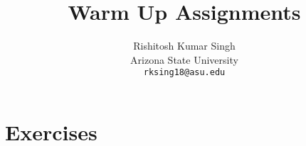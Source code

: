 \documentclass[10pt,twocolumn,letterpaper]{article}
\title{Warm Up Assignments}
\author{Rishitosh Kumar Singh\\
Arizona State University\\
{\tt\small rksing18@asu.edu}
}
\begin{document}
\maketitle



    
    

\section{Exercises}
\label{sec:exercises}











{
    \small
    
    
}

% 
\end{document}
